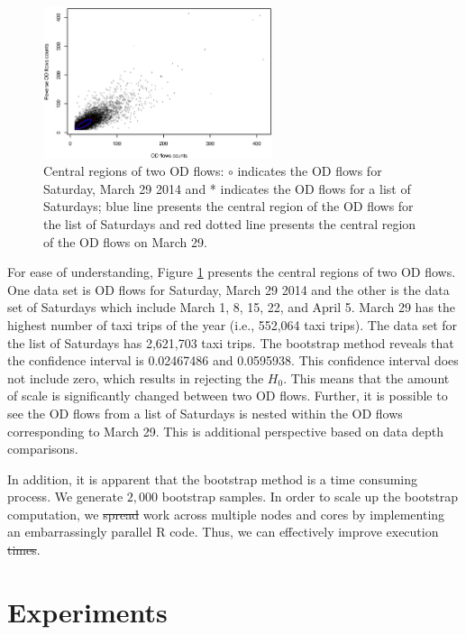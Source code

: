 \documentclass[a4paper,UKenglish]{lipics-v2016}
\providecommand{\DIFadd}[1]{{\protect\color{blue}\uwave{#1}}} %
\providecommand{\DIFdel}[1]{{\protect\color{red}\sout{#1}}}                      %
\providecommand{\DIFaddbegin}{} %
\providecommand{\DIFaddend}{} %
\providecommand{\DIFdelbegin}{} %
\providecommand{\DIFdelend}{} %
\begin{document}
\begin{figure}
	\centering
	\includegraphics[width=0.6\textwidth]{images/com_mar_0329.eps}
	\caption{Central regions of two OD flows: $\circ$ indicates the OD flows for Saturday, March 29 2014 and * indicates the OD flows for a list of Saturdays; blue line presents the central region of the OD flows for the list of Saturdays and red dotted line presents the central region of the OD flows on March 29.}
	\label{fig:com_mar_0329}	
\end{figure}

For ease of understanding, Figure \ref{fig:com_mar_0329} presents the central regions of two OD flows. One data set is OD flows for Saturday, March 29 2014 and the other is  the data set of Saturdays which include March  1, 8, 15, 22, and April 5. March 29 has the highest number of taxi trips of the year (i.e., 552,064 taxi trips).  The data set for the list of Saturdays has 2,621,703 taxi trips. The bootstrap method reveals that the confidence interval is 0.02467486 and 0.0595938. This confidence interval does not include zero, which results in rejecting the $H_0$. This means that the amount of scale is significantly changed between two OD flows. Further, it is possible to see the OD flows from a list of Saturdays is nested within the OD flows corresponding to March 29. This is additional perspective based on data depth comparisons. 

In addition, it is apparent that the bootstrap method is a time consuming process. We generate $2,000$ bootstrap samples. In order to scale up the bootstrap computation, we \DIFdelbegin \DIFdel{spread }\DIFdelend \DIFaddbegin \DIFadd{distribute }\DIFaddend work across multiple nodes and cores by implementing an embarrassingly parallel R code.  Thus, we can effectively improve execution \DIFdelbegin \DIFdel{times}\DIFdelend \DIFaddbegin \DIFadd{efficiency}\DIFaddend .

\section{Experiments}
\label{sec:experiments}
\end{document}
